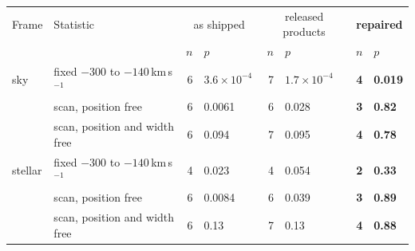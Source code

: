 \begin{tabular}{@{}llr@{~}lr@{~}lr@{~}l@{}}
\hline
Frame & Statistic & \multicolumn{2}{c}{as shipped} & \multicolumn{2}{c}{released products} & \multicolumn{2}{c}{\textbf{repaired}} \\
 & & $n$ & $p$ & $n$ & $p$ & $n$ & $p$ \\
\hline
sky & fixed $-300$ to $-140$\,km\,s$^{-1}$ & 6 & $3.6\times10^{-4}$ & 7 & $1.7\times10^{-4}$ & \textbf{4} & \textbf{0.019} \\
 & scan, position free & 6 & 0.0061 & 6 & 0.028 & \textbf{3} & \textbf{0.82} \\
 & scan, position and width free & 6 & 0.094 & 7 & 0.095 & \textbf{4} & \textbf{0.78} \\
\hline
stellar & fixed $-300$ to $-140$\,km\,s$^{-1}$ & 4 & 0.023 & 4 & 0.054 & \textbf{2} & \textbf{0.33} \\
 & scan, position free & 6 & 0.0084 & 6 & 0.039 & \textbf{3} & \textbf{0.89} \\
 & scan, position and width free & 6 & 0.13 & 7 & 0.13 & \textbf{4} & \textbf{0.88} \\
\hline
\end{tabular}
